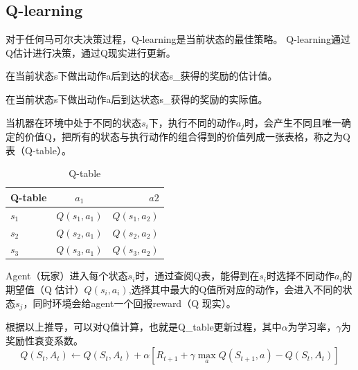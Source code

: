 \subsection{Q-learning}
对于任何马可尔夫决策过程，Q-learning\cite{Mnih2013Playing}是当前状态的最佳策略。
Q-learning通过Q估计进行决策，通过Q现实进行更新。
\begin{defn}[Q 估计]
  在当前状态s下做出动作a后到达的状态s\_获得的奖励的估计值。
\end{defn}
\begin{defn}[Q 现实]
  在当前状态s下做出动作a后到达状态s\_获得的奖励的实际值。
\end{defn}
\begin{defn}[Q 表]
  当机器在环境中处于不同的状态$s_i$下，执行不同的动作$a_j$时，会产生不同且唯一确定的价值Q，把所有的状态与执行动作的组合得到的价值列成一张表格，称之为Q表（Q-table）。
  \begin{table}
    \begin{center}
      \caption{Q-table}
      \begin{tabular}{|l|c|r|} 
        \hline
        Q-table & $a_1$ & $a2$ \\ 
        \hline
        $s_1$ & $Q(s_1,a_1)$ & $Q(s_1,a_2)$ \\ 
        \hline
        $s_2$ & $Q(s_2,a_1)$ & $Q(s_2,a_2)$ \\ 
        \hline
        $s_3$ & $Q(s_3,a_1)$ & $Q(s_3,a_2)$ \\ 
        \hline
      \end{tabular}
      
    \end{center}
  \end{table}
  
\end{defn}
Agent（玩家）进入每个状态$s_i$时，通过查阅Q表，能得到在$s_i$时选择不同动作$a_i$的期望值（Q 估计）$Q(s_i,a_i)$,选择其中最大的Q值所对应的动作，会进入不同的状态$s_j$，同时环境会给agent一个回报reward（Q 现实）。
\begin{cor}[Q-learning]
  根据以上推导，可以对Q值计算，也就是Q\_table更新过程，其中$\alpha$为学习率，$\gamma$为奖励性衰变系数。
  \begin{equation}
    Q\left(S_{t}, A_{t}\right) \leftarrow Q\left(S_{t}, A_{t}\right)+\alpha\left[R_{t+1}+\gamma \max _{a} Q\left(S_{t+1}, a\right)-Q\left(S_{t}, A_{t}\right)\right]
  \end{equation}
\end{cor}
